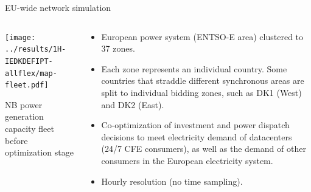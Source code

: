\begin{frame}{EU-wide network simulation}

  \begin{columns}[T]
  \begin{column}{10cm}

  \centering
  \texttt{[image: ../results/1H-IEDKDEFIPT-allflex/map-fleet.pdf]}

  {\scriptsize
  NB power generation capacity fleet before optimization stage\\
  }

  \end{column}

  \begin{column}{6cm}
  {\small
  \begin{itemize}
  \vspace{-.1cm}
  \item European power system (ENTSO-E area) clustered to \alert{37 zones}.
  \item Each zone represents an individual country. Some countries
  that straddle different synchronous areas are split to individual
  bidding zones, such as DK1 (West) and DK2 (East).
  \item \alert{Co-optimization} of investment and power dispatch
  decisions to meet electricity demand of datacenters (24/7 CFE consumers), as well as the demand of other
  consumers in the European electricity system. 
  \item \alert{Hourly resolution} (no time sampling).
  
  \end{itemize}
  }

  \end{column}
  \end{columns}

\end{frame}



